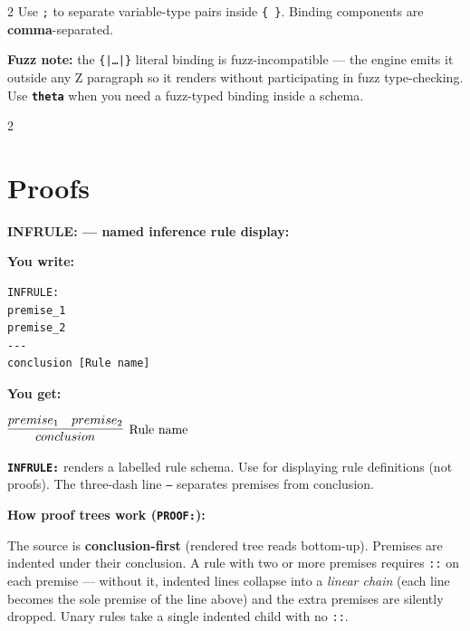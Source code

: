 \documentclass[10pt,landscape,a4paper]{article}
\newcommand{\kw}[1]{\texttt{\bfseries #1}}
\newenvironment{exwrite}%
  {\par\nobreak\noindent\scriptsize\textbf{You write:}\par\nobreak\vspace{0pt}\scriptsize}%
  {\vspace{1pt}\nobreak}
\newenvironment{exget}%
  {\par\nobreak\noindent\scriptsize\textbf{You get:}\par\nobreak\vspace{0pt}\small}%
  {\par\vspace{3pt}}
\begin{document}
\begin{multicols}{2}
{\scriptsize Use \texttt{;} to separate variable-type pairs inside \texttt{\{ \}}. Binding components are \textbf{comma}-separated.}

\smallskip
{\scriptsize\textbf{Fuzz note:} the \texttt{\{|\ldots|\}} literal binding is fuzz-incompatible — the engine emits it outside any Z paragraph so it renders without participating in fuzz type-checking. Use \kw{theta} when you need a fuzz-typed binding inside a schema.}

\end{multicols}

\newpage

\begin{multicols}{2}
\raggedcolumns

\section{Proofs}

\textbf{INFRULE: — named inference rule display:}

\begin{exwrite}%
\begin{verbatim}
INFRULE:
premise_1
premise_2
---
conclusion [Rule name]
\end{verbatim}
\end{exwrite}
\begin{exget}%
\begin{center}
$\infer[\mbox{Rule name}]{conclusion}{premise_1 & premise_2}$
\end{center}
\end{exget}

{\scriptsize \kw{INFRULE:} renders a labelled rule schema. Use for displaying rule definitions (not proofs). The three-dash line \texttt{---} separates premises from conclusion.}

\smallskip
{}
\textbf{How proof trees work (\kw{PROOF:}):}

{\scriptsize The source is \textbf{conclusion-first} (rendered tree reads
bottom-up). Premises are indented under their conclusion. A rule with
two or more premises requires \texttt{::} on each premise --- without
it, indented lines collapse into a \emph{linear chain} (each line
becomes the sole premise of the line above) and the extra premises
are silently dropped. Unary rules take a single indented child with
no \texttt{::}.}


\end{multicols}
\end{document}

